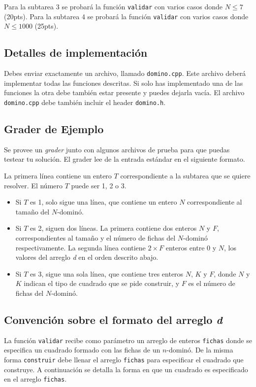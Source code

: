 \documentclass{oci}
\begin{document}
Para la subtarea 3 se probará la función \verb+validar+ con varios casos donde $N\leq 7$ (20pts).
Para la subtarea 4 se probará la función \verb+validar+ con varios casos donde $N\leq 1000$ (25pts).

\subsection*{Detalles de implementación}
Debes enviar exactamente un archivo, llamado \verb+domino.cpp+.
Este archivo deberá implementar todas las funciones descritas.
Si solo has implementado una de las funciones la otra debe también estar presente y puedes dejarla vacía.
El archivo \verb+domino.cpp+ debe también incluir el header \verb+domino.h+.

\subsection*{Grader de Ejemplo}
Se provee un \emph{grader} junto con algunos archivos de prueba para que puedas testear tu solución.
El grader lee de la entrada estándar en el siguiente formato.

La primera línea contiene un entero $T$ correspondiente a la subtarea que se quiere resolver.
El número $T$ puede ser 1, 2 o 3.
\begin{itemize}
 \item Si $T$ es 1, solo sigue una línea, que contiene un entero $N$ correspondiente al tamaño del $N$-dominó.
 \item Si $T$ es 2, siguen dos líneas.
La primera contiene dos enteros $N$ y $F$, correspondientes al tamaño y el número de fichas del $N$-dominó respectivamente.
La segunda línea contiene $2\times F$ enteros entre 0 y $N$, los valores del arreglo \emph{d} en el orden descrito abajo.
 \item Si $T$ es 3, sigue una sola línea, que contiene tres enteros $N$, $K$ y $F$, donde $N$ y $K$ indican el tipo de cuadrado que se pide construir, y $F$ es el número de fichas del $N$-dominó.
\end{itemize}

\subsection*{Convención sobre el formato del arreglo \emph{d}}
La función \verb+validar+ recibe como parámetro un arreglo de enteros \verb+fichas+ donde se especifica un cuadrado formado con las fichas de un $n$-dominó.
De la misma forma \verb+construir+ debe llenar el arreglo \verb+fichas+ para especificar el cuadrado que construye.
A continuación se detalla la forma en que un cuadrado es especificado en el arreglo \verb+fichas+.
\end{document}
